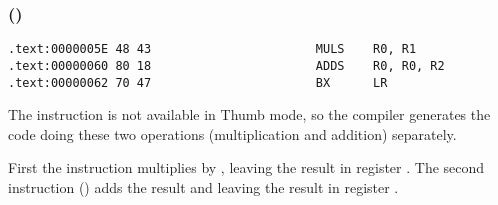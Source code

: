 \subsubsection{\OptimizingKeilVI (\ThumbMode)}

\begin{lstlisting}[label=ARM_leaf_example2]
.text:0000005E 48 43                       MULS    R0, R1
.text:00000060 80 18                       ADDS    R0, R0, R2
.text:00000062 70 47                       BX      LR
\end{lstlisting}

The  instruction is not available in Thumb mode, so the compiler generates the code doing these two 
operations (multiplication and addition) separately.

First the  instruction multiplies  by , leaving the result in register .
The second instruction () adds the result and  leaving the result in register .

